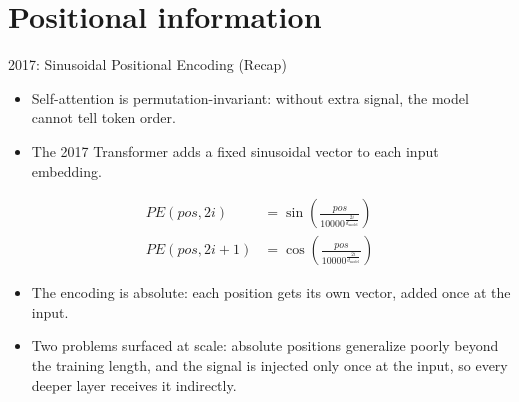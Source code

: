 \section{Positional information}

\begin{frame}{2017: Sinusoidal Positional Encoding (Recap)}
  \begin{itemize}
    \item[$\blacktriangleright$] Self-attention is permutation-invariant: without extra signal, the model cannot tell token order.
    \item[$\blacktriangleright$] The 2017 Transformer adds a fixed sinusoidal vector to each input embedding.
  \end{itemize}

  \vspace{0.5em}
  \begin{align*}
    PE(pos, 2i) &= \sin\left(\frac{pos}{10000^{\frac{2i}{d_{\text{model}}}}}\right) \\
    PE(pos, 2i+1) &= \cos\left(\frac{pos}{10000^{\frac{2i}{d_{\text{model}}}}}\right)
  \end{align*}

  \vspace{0.5em}
  \begin{itemize}
    \item[$\blacktriangleright$] The encoding is absolute: each position gets its own vector, added once at the input.
    \item[$\blacktriangleright$] Two problems surfaced at scale: absolute positions generalize poorly beyond the training length, and the signal is injected only once at the input, so every deeper layer receives it indirectly.
  \end{itemize}
\end{frame}

